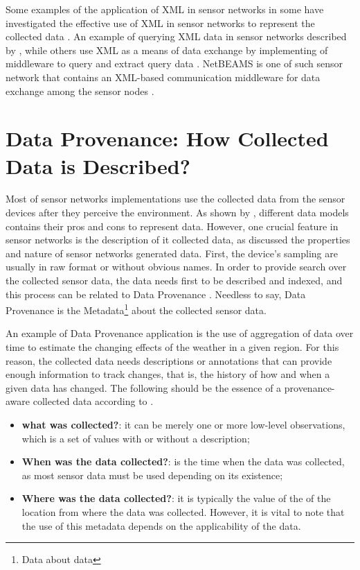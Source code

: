 Some examples of the application of XML in sensor networks in
\cite{sn-xml-usage02} some have investigated the effective use of XML in
sensor networks to represent the collected data \cite{sn-xml-usage01}. An
example of querying XML data in sensor networks described by
\cite{sn-xml-query-engines}, while others use XML as a means of data exchange
by implementing of middleware to query and extract query data
\cite{sn-xml-middleware}. NetBEAMS is one of such sensor network that contains
an XML-based communication middleware for data exchange among the sensor nodes
\cite{netbeams2009}.

\section{Data Provenance: How Collected Data is Described?}
\label{sec:sn-provenance}

Most of sensor networks implementations use the collected data from the sensor
devices after they perceive the environment. As shown by
\cite{sn-data-model-survey}, different data models contains their pros and
cons to represent data. However, one crucial feature in sensor networks is the
description of it collected data, as \cite{sn-provenance} discussed the
properties and nature of sensor networks generated data. First, the device's
sampling are usually in raw format or without obvious names. In order to
provide search over the collected sensor data, the data needs first to be
described and indexed, and this process can be related to Data Provenance
\cite{db-provenance}. Needless to say, Data Provenance is the
Metadata\footnote{Data about data} about the collected sensor data.

An example of Data Provenance application is the use of aggregation of data
over time to estimate the changing effects of the weather in a given region.
For this reason, the collected data needs descriptions or annotations that can
provide enough information to track changes, that is, the history of how and
when a given data has changed. The following should be the essence of a
provenance-aware collected data according to \cite{sn-provenance}.

\begin{itemize}
  \item \textbf{what was collected?}: it can be merely one or more low-level
  observations,  which is a set of values with or without a description;
  \item \textbf{When was the data collected?}: is the time when the data was
  collected,  as most sensor data must be used depending on its existence;
  \item \textbf{Where was the data collected?}: it is typically the value of 
  the of the location from where the data was collected. However, it is vital to
  note that the use of this metadata depends on the applicability of the data.
\end{itemize}

